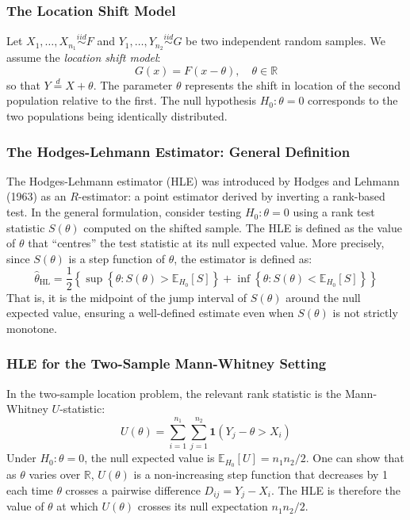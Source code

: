\documentclass[10pt]{article}
\begin{document}
\subsubsection{The Location Shift Model}

Let $X_1, \ldots, X_{n_1} \overset{iid}{\sim} F$ and $Y_1, \ldots, Y_{n_2} \overset{iid}{\sim} G$ be two independent random samples. We assume the \textit{location shift model}:
\[
G(x) = F(x - \theta), \quad \theta \in \mathbb{R}
\]
so that $Y \overset{d}{=} X + \theta$. The parameter $\theta$ represents the shift in location of the second population relative to the first. The null hypothesis $H_0: \theta = 0$ corresponds to the two populations being identically distributed.

\subsubsection{The Hodges-Lehmann Estimator: General Definition}

The Hodges-Lehmann estimator (HLE) was introduced by Hodges and Lehmann (1963) as an $R$-estimator: a point estimator derived by inverting a rank-based test. In the general formulation, consider testing $H_0: \theta = 0$ using a rank test statistic $S(\theta)$ computed on the shifted sample. The HLE is defined as the value of $\theta$ that ``centres'' the test statistic at its null expected value. More precisely, since $S(\theta)$ is a step function of $\theta$, the estimator is defined as:
\[
\widehat{\theta}_{\mathrm{HL}} = \frac{1}{2}\left\{ \sup\left\{\theta : S(\theta) > \mathbb{E}_{H_0}[S]\right\} + \inf\left\{\theta : S(\theta) < \mathbb{E}_{H_0}[S]\right\} \right\}
\]
That is, it is the midpoint of the jump interval of $S(\theta)$ around the null expected value, ensuring a well-defined estimate even when $S(\theta)$ is not strictly monotone.

\subsubsection{HLE for the Two-Sample Mann-Whitney Setting}

In the two-sample location problem, the relevant rank statistic is the Mann-Whitney $U$-statistic:
\[
U(\theta) = \sum_{i=1}^{n_1}\sum_{j=1}^{n_2} \mathbf{1}(Y_j - \theta > X_i)
\]
Under $H_0: \theta = 0$, the null expected value is $\mathbb{E}_{H_0}[U] = n_1 n_2 / 2$. One can show that as $\theta$ varies over $\mathbb{R}$, $U(\theta)$ is a non-increasing step function that decreases by 1 each time $\theta$ crosses a pairwise difference $D_{ij} = Y_j - X_i$. The HLE is therefore the value of $\theta$ at which $U(\theta)$ crosses its null expectation $n_1 n_2/2$.
\end{document}
